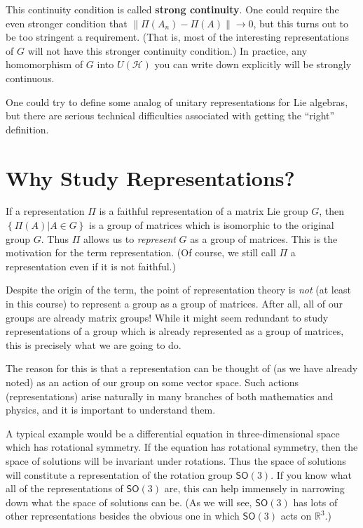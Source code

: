 \documentclass{amsbook}
\theoremstyle{plain}
\numberwithin{equation}{chapter}
\numberwithin{theorem}{chapter}
\begin{document}
This continuity condition is called \textbf{strong continuity}. One could
require the even stronger condition that $\left\|  \Pi(A_{n})-\Pi(A)\right\|
\rightarrow0$, but this turns out to be too stringent a requirement. (That is,
most of the interesting representations of $G$ will not have this stronger
continuity condition.) In practice, any homomorphism of $G$ into
$U(\mathcal{H})$ you can write down explicitly will be strongly continuous.

One could try to define some analog of unitary representations for Lie
algebras, but there are serious technical difficulties associated with getting
the ``right'' definition.

\section{Why Study Representations?}

If a representation $\Pi$ is a faithful representation of a matrix Lie group
$G$, then $\left\{  \Pi(A)\left|  A\in G\right.  \right\}  $ is a group of
matrices which is isomorphic to the original group $G$. Thus $\Pi$ allows us
to \textit{represent} $G$ as a group of matrices. This is the motivation for
the term representation. (Of course, we still call $\Pi$ a representation even
if it is not faithful.)

Despite the origin of the term, the point of representation theory is
\textit{not} (at least in this course) to represent a group as a group of
matrices. After all, all of our groups are already matrix groups! While it
might seem redundant to study representations of a group which is already
represented as a group of matrices, this is precisely what we are going to do.

The reason for this is that a representation can be thought of (as we have
already noted) as an action of our group on some vector space. Such actions
(representations) arise naturally in many branches of both mathematics and
physics, and it is important to understand them.

A typical example would be a differential equation in three-dimensional space
which has rotational symmetry. If the equation has rotational symmetry, then
the space of solutions will be invariant under rotations. Thus the space of
solutions will constitute a representation of the rotation group
$\mathsf{SO}(3)$. If you know what all of the representations of
$\mathsf{SO}(3)$ are, this can help immensely in narrowing down what the space
of solutions can be. (As we will see, $\mathsf{SO}(3)$ has lots of other
representations besides the obvious one in which $\mathsf{SO}(3)$ acts on
$\mathbb{R}^{3}$.)
\end{document}
